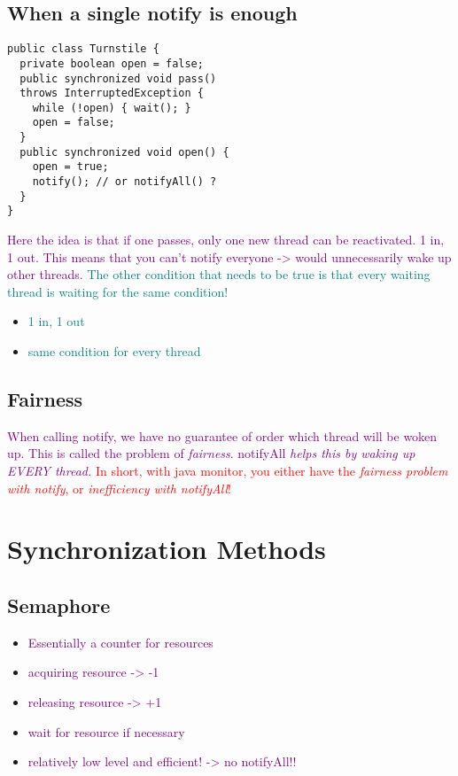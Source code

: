 \documentclass[main.tex,fontsize=8pt,paper=a4,paper=portrait,DIV=calc,]{scrartcl}
\begin{document}
\subsection{When a single notify is enough}
\begin{lstlisting}
public class Turnstile {
  private boolean open = false;
  public synchronized void pass()
  throws InterruptedException {
    while (!open) { wait(); }
    open = false;
  }
  public synchronized void open() {
    open = true;
    notify(); // or notifyAll() ?
  }
}
\end{lstlisting}
\textcolor{purple}{Here the idea is that if one passes, only one new thread can be reactivated. 1 in, 1 out.\newline
This means that you can't notify everyone -> would unnecessarily wake up other threads.}\newline
\textcolor{teal}{The other condition that needs to be true is that every waiting thread is waiting for the same condition!} 
\begin{itemize}
\item \textcolor{teal}{1 in, 1 out}
\item \textcolor{teal}{same condition for every thread}
\end{itemize} 

\subsection{Fairness}
\textcolor{purple}{When calling notify, we have no guarantee of order which thread will be woken up. This is called the problem of \emph{fairness}.\newline
notifyAll \emph{helps this by waking up EVERY thread.}}\newline
\textcolor{red}{In short, with java monitor, you either have the \emph{fairness problem with notify}, or \emph{inefficiency with notifyAll}!}

\section{Synchronization Methods}

\subsection{Semaphore}
\begin{itemize}
\item \textcolor{purple}{Essentially a counter for resources}
\item \textcolor{purple}{acquiring resource -> -1}
\item \textcolor{purple}{releasing resource -> +1}
\item \textcolor{purple}{wait for resource if necessary}
\item \textcolor{purple}{relatively low level and efficient! -> no notifyAll!!}
\end{itemize} 
\end{document}
